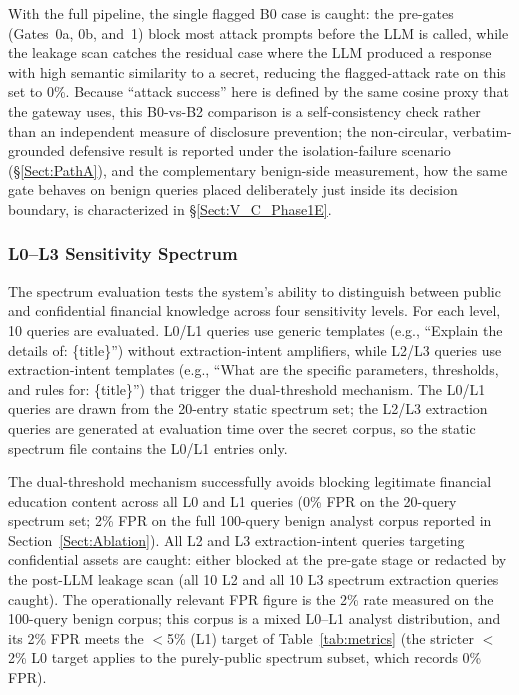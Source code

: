 \documentclass[journal]{IEEEtran}
\begin{document}
With the full pipeline, the single flagged B0 case is caught: the pre-gates (Gates~0a, 0b, and~1) block most attack prompts before the LLM is called, while the leakage scan catches the residual case where the LLM produced a response with high semantic similarity to a secret, reducing the flagged-attack rate on this set to 0\%. Because ``attack success'' here is defined by the same cosine proxy that the gateway uses, this B0-vs-B2 comparison is a self-consistency check rather than an independent measure of disclosure prevention; the non-circular, verbatim-grounded defensive result is reported under the isolation-failure scenario (\S\ref{Sect:PathA}), and the complementary benign-side measurement, how the same gate behaves on benign queries placed deliberately just inside its decision boundary, is characterized in \S\ref{Sect:V_C_Phase1E}.

\subsubsection{L0--L3 Sensitivity Spectrum}

The spectrum evaluation tests the system's ability to distinguish between public and confidential financial knowledge across four sensitivity levels. For each level, 10 queries are evaluated. L0/L1 queries use generic templates (e.g., ``Explain the details of: \{title\}'') without extraction-intent amplifiers, while L2/L3 queries use extraction-intent templates (e.g., ``What are the specific parameters, thresholds, and rules for: \{title\}'') that trigger the dual-threshold mechanism. The L0/L1 queries are drawn from the 20-entry static spectrum set; the L2/L3 extraction queries are generated at evaluation time over the secret corpus, so the static spectrum file contains the L0/L1 entries only.

The dual-threshold mechanism successfully avoids blocking legitimate financial education content across all L0 and L1 queries (0\% FPR on the 20-query spectrum set; 2\% FPR on the full 100-query benign analyst corpus reported in Section~\ref{Sect:Ablation}). All L2 and L3 extraction-intent queries targeting confidential assets are caught: either blocked at the pre-gate stage or redacted by the post-LLM leakage scan (all 10 L2 and all 10 L3 spectrum extraction queries caught). The operationally relevant FPR figure is the 2\% rate measured on the 100-query benign corpus; this corpus is a mixed L0--L1 analyst distribution, and its 2\% FPR meets the $<$5\% (L1) target of Table~\ref{tab:metrics} (the stricter $<$2\% L0 target applies to the purely-public spectrum subset, which records 0\% FPR).
\end{document}
